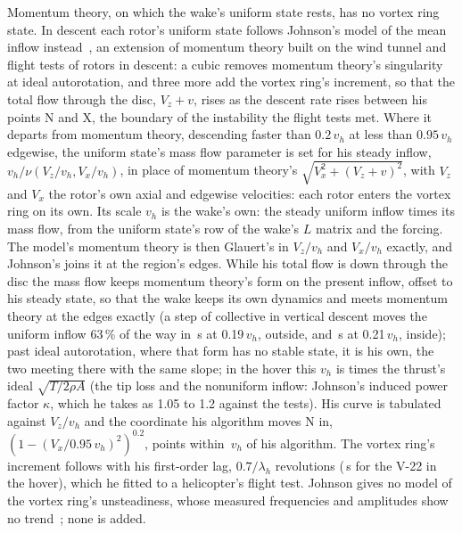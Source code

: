 \documentclass[10pt,a4paper,twocolumn]{article}
\begin{document}
Momentum theory, on which the wake's uniform state rests, has no vortex ring state. In descent each rotor's uniform state follows
Johnson's model of the mean inflow instead~\cite{vrs}, an extension of momentum theory built on the wind tunnel and flight tests of
rotors in descent: a cubic removes momentum theory's singularity at ideal autorotation, and three more add the vortex ring's
increment, so that the total flow through the disc, $V_z+v$, rises as the descent rate rises between his points N and X, the
boundary of the instability the flight tests met. Where it departs from momentum theory, descending faster than $0.2\,v_h$ at less
than $0.95\,v_h$ edgewise, the uniform state's mass flow parameter is set for his steady inflow, $v_h/\nu(V_z/v_h, V_x/v_h)$, in place of
momentum theory's $\sqrt{V_x^2+(V_z+v)^2}$, with $V_z$ and $V_x$ the rotor's own axial and edgewise velocities: each rotor enters the vortex
ring on its own. Its scale $v_h$ is the wake's own: the steady uniform inflow times its mass flow, from the uniform state's row of
the wake's $L$ matrix and the forcing. The model's momentum theory is then Glauert's in $V_z/v_h$ and $V_x/v_h$ exactly, and
Johnson's joins it at the region's edges. While his total flow is down through the disc the mass flow keeps momentum theory's form
on the present inflow, offset to his steady state, so that the wake keeps its own dynamics and meets momentum theory at the edges
exactly (a step of collective in vertical descent moves the uniform inflow 63\,\% of the way in \NVrsEdgeOut\,s at 0.19\,$v_h$, outside, and
\NVrsEdgeIn\,s at 0.21\,$v_h$, inside); past ideal autorotation, where that form has no stable state, it is his own, the two meeting there
with the same slope; in the hover this $v_h$ is \NVrsKappa{} times the thrust's
ideal $\sqrt{T/2\rho A}$ (the tip loss and the nonuniform inflow: Johnson's induced power factor $\kappa$, which he takes as 1.05
to 1.2 against the tests). His curve is tabulated against $V_z/v_h$ and the coordinate his algorithm moves N in,
$(1-(V_x/0.95\,v_h)^2)^{0.2}$, \NVrsTabN{} points within \NVrsTabErr\,$v_h$ of his algorithm. The vortex ring's increment follows with his
first-order lag, $0.7/\lambda_h$ revolutions (\NVrsTau\,s for the V-22 in
the hover), which he fitted to a helicopter's flight test. Johnson gives no model of the vortex ring's unsteadiness, whose measured
frequencies and amplitudes show no trend~\cite{vrs}; none is added.
\end{document}
